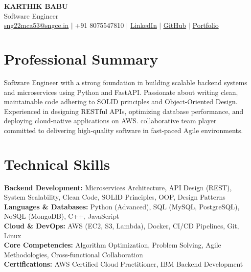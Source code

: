\documentclass[letterpaper,11pt]{article}
\begin{document}
\begin{center}
    \textbf{\Huge \scshape KARTHIK BABU} \\ \vspace{1pt}
    \small Software Engineer \\ \vspace{3pt}
    \small \href{mailto:sng22mca53@sngce.in}{sng22mca53@sngce.in} $|$ 
    +91 8075547810 $|$ 
    \href{https://www.linkedin.com/in/karthikbabudatanalyst/}{LinkedIn} $|$
    \href{https://github.com/Karthi2001MCA}{GitHub} $|$
    \href{https://Karthi2001MCA.github.io/Karthik_Portfolio/}{Portfolio}
\end{center}
\vspace{-5pt}

\section{Professional Summary}
  \small{Software Engineer with a strong foundation in building scalable backend systems and microservices using Python and FastAPI. Passionate about writing clean, maintainable code adhering to SOLID principles and Object-Oriented Design. Experienced in designing RESTful APIs, optimizing database performance, and deploying cloud-native applications on AWS. collaborative team player committed to delivering high-quality software in fast-paced Agile environments.}

\section{Technical Skills}
 \begin{itemize}[leftmargin=0.15in, label={}]
    \small{\item{
     \textbf{Backend Development:} Microservices Architecture, API Design (REST), System Scalability, Clean Code, SOLID Principles, OOP, Design Patterns \\
     \textbf{Languages \& Databases:} Python (Advanced), SQL (MySQL, PostgreSQL), NoSQL (MongoDB), C++, JavaScript \\
     \textbf{Cloud \& DevOps:} AWS (EC2, S3, Lambda), Docker, CI/CD Pipelines, Git, Linux \\
     \textbf{Core Competencies:} Algorithm Optimization, Problem Solving, Agile Methodologies, Cross-functional Collaboration \\ \textbf{Certifications:} AWS Certified Cloud Practitioner, IBM Backend Development
    }}
 \end{itemize}
 \vspace{-8pt}
\end{document}
